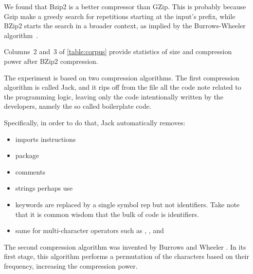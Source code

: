 We found that Bzip2 is a better compressor than GZip. This is probably because
Gzip make a greedy search for repetitions starting at the input's prefix, while
BZip2 starts the search in a broader context, as implied by the
Burrows-Wheeler algorithm~\cite{Burrows:Wheeler:94}. 

Columns~2 and~3 of \cref{table:corpus} provide statistics of size and
compression power after BZip2 compression. 



The experiment is based on two compression algorithms.
The first compression algorithm is called Jack, and it rips off from the file all the code note related to the programming logic, leaving
only the code intentionally written by the developers, namely the so called boilerplate code.

Specifically, in order to do that, Jack automatically removes:

\begin{itemize}
  \item imports instructions
  \item package
  \item comments
  \item strings perhaps use
  \item keywords are replaced by a single symbol rep
        but not identifiers. Take note that it is common wisdom that the bulk of code is identifiers.
  \item same for multi-character operators such as \cc{->}, \cc{[]}, and \cc{<<<<=}
\end{itemize}

The second compression algorithm was invented by Burrows and Wheeler
\cite{Burrows:Wheeler:94}. In its first stage, this algorithm performs a
permutation of the characters based on their frequency, increasing the
compression power.


